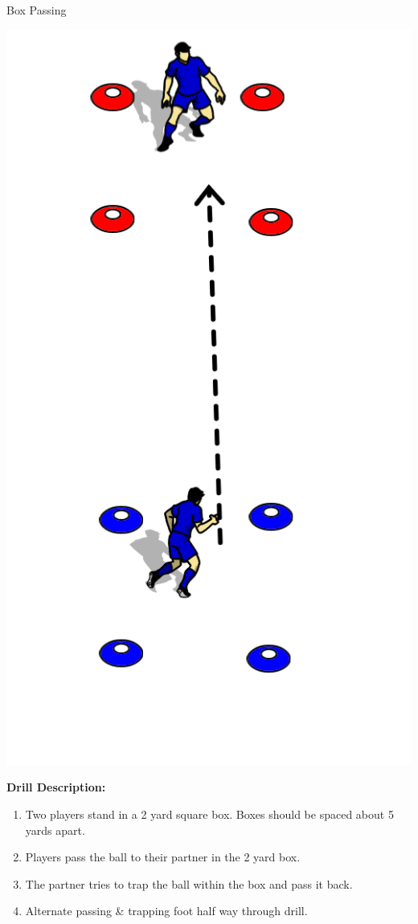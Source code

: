 \begin{oddBlock}{Box Passing}

\begin{minipage}[t]{\linewidth}
    \centering
    
    \begin{minipage}{.3\linewidth} %
        \centering
        \includegraphics[width=.8\textwidth]{../img/Trimmed/Box_Passing_BW}
    \end{minipage}
    \hspace{0.05\linewidth}
    \begin{minipage}{.6\linewidth} %
        \textbf{Drill Description:}

        \begin{enumerate}
            \setlength{\itemsep}{0pt}
            \setlength{\parskip}{0pt}
            \setlength{\parsep}{0pt}
            \item Two players stand in a 2 yard square box.  Boxes should be spaced about 5 yards apart.
            \item Players pass the ball to their partner in the 2 yard box.
            \item The partner tries to trap the ball within the box and pass it back.
            \item Alternate passing \& trapping foot half way through drill.
        \end{enumerate}


\end{minipage}
\end{minipage}
\end{oddBlock}
